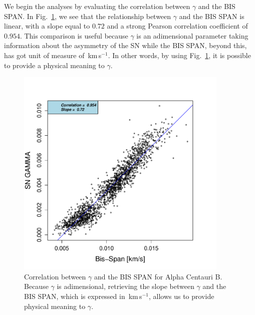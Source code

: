 \documentclass[11pt, oneside]{article}
\def\kms{\hbox{\,km\,s$^{-1}$}}       %
\begin{document}
We begin the analyses by evaluating the correlation between $\gamma$ and the BIS SPAN. In Fig.~\ref{fig:alphacent:corr.gamma}, we see that the relationship between $\gamma$ and the BIS SPAN is linear, with a slope equal to $0.72$ and a strong Pearson correlation coefficient of $0.954$. This comparison is useful because $\gamma$ is an adimensional parameter taking information about the asymmetry of the SN while the BIS SPAN, beyond this, has got unit of measure of \kms. In other words, by using Fig.~\ref{fig:alphacent:corr.gamma}, it is possible to provide a physical meaning to $\gamma$.
%
\begin{figure}[htbp]
   \centering
\includegraphics[height = 4in]{HD12862_[2]gamma_vs_bisspan.pdf} 
   \caption{Correlation between $\gamma$ and the BIS SPAN for Alpha Centauri B. Because $\gamma$ is adimensional, retrieving the slope between $\gamma$ and the BIS SPAN, which is expressed in \kms, allows us to provide physical meaning to $\gamma$.}
   \label{fig:alphacent:corr.gamma}
\end{figure}
%
\end{document}
